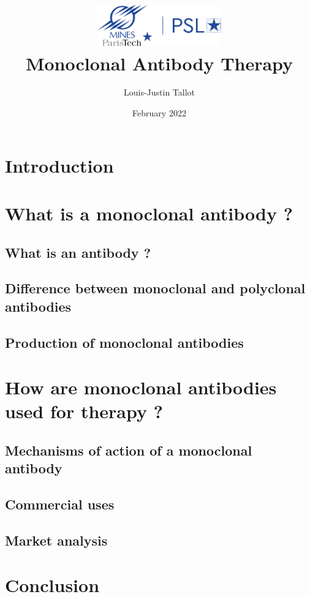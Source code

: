 \documentclass{article}
\title{
  \includegraphics[width=0.4\textwidth]{../Images/Logo_Mines_ParisTech.png}\\
  \vspace{1em}
  \textbf{Monoclonal Antibody Therapy}
}
\author{Louis-Justin Tallot}
\date{February 2022}
\begin{document}
  \maketitle

  \section*{Introduction}
  

  \section{What is a monoclonal antibody ?}

    \subsection{What is an antibody ?}
    

    \subsection{Difference between monoclonal and polyclonal antibodies}
    

    \subsection{Production of monoclonal antibodies}
    \label{sec:monoclonal_antibody_production}
    

  \section{How are monoclonal antibodies used for therapy ?}
  

    \subsection{Mechanisms of action of a monoclonal antibody}
    

    \subsection{Commercial uses}
    

    \subsection{Market analysis}
    
  
  \section*{Conclusion}
  


  \printbibliography

  \listoffigures
\end{document}

